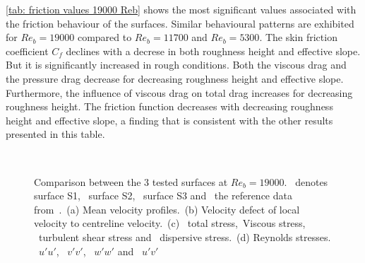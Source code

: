 \autoref{tab: friction values 19000 Reb} shows the most significant values associated with the friction behaviour of the surfaces.
Similar behavioural patterns are exhibited for $Re_b = 19000$ compared to $Re_b = 11700$ and $Re_b = 5300$.
The skin friction coefficient $C_f$ declines with a decrese in both  roughness height and  effective slope. But it is significantly increased in rough conditions.
Both the viscous drag and the pressure drag decrease for decreasing roughness height and effective slope.
Furthermore, the influence of viscous drag on total drag increases for decreasing roughness height.
The friction function decreases with decreasing roughness height and effective slope, a finding that is consistent with the other results presented in this table.
\begin{figure}
    \centering
    \begin{subfigure}[t]{0.495\textwidth}
        \centering
        \subcaption{}
        
        \label{subfig: Reb 19000 velocity profile}
    \end{subfigure}
    \hfill
    \begin{subfigure}[t]{0.49\textwidth}
        \centering
        \subcaption{}
        
        \label{subfig: Reb 19000 velocity defect}        
    \end{subfigure}
    \plotverticalspacing
    \begin{subfigure}[t]{0.495\textwidth}
        \centering
        \subcaption{}
        
        \label{subfig: Reb 19000 total stresses}
    \end{subfigure}
    \hfill
    \begin{subfigure}[t]{0.495\textwidth}
        \centering
        \subcaption{}
        
        \label{subfig: Reb 19000 reynolds stresses}
    \end{subfigure}
    \\[-10pt]
    \caption[Comparison of $S1$, $S2$ and $S3$ at $Re_b = 19000$]{Comparison between the 3 tested surfaces at $Re_b = 19000$. \sOneNineteenSymbol \ denotes surface S1, \sTwoNineteenSymbol \ surface S2, \sThreeNineteenSymbol \ surface S3 and  \ the reference data from~\cite{yaoDirectNumericalSimulations2023}.~(a) Mean velocity profiles.~(b) Velocity defect of local velocity to centreline velocity.~(c) \lsTotalStressSymbol \ total stress,\lsViscousStressSymbol \ Viscous stress, \lsReynoldsStressSymbol \ turbulent shear stress and \lsDispersiveStressSymbol \ dispersive stress.~(d) Reynolds stresses. \lsRuuSymbol \ $u'u'$, \lsRvvSymbol \ $v'v'$, \lsRwwSymbol \ $w'w'$ and \lsRuvSymbol \ $u'v'$}
    \label{fig: comp Reb 19000}
\end{figure}


